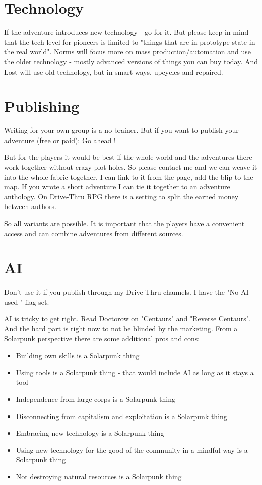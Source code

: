 \section{Technology}

If the adventure introduces new technology - go for it. But please keep in mind that the tech level for pioneers is limited to "things that are in prototype state in the real world". Norms will focus more on mass production/automation and use the older technology - mostly advanced versions of things you can buy today. And Lost will use old technology, but in smart ways, upcycles and repaired.

\section{Publishing}

Writing for your own group is a no brainer. But if you want to publish your adventure (free or paid): Go ahead !

But for the players it would be best if the whole world and the adventures there work together without crazy plot holes. So please contact me and we can weave it into the whole fabric together. I can link to it from the page, add the blip to the map. If you wrote a short adventure I can tie it together to an adventure anthology. On Drive-Thru RPG there is a setting to split the earned money between authors.

So all variants are possible. It is important that the players have a convenient access and can combine adventures from different sources.

\section{AI}

Don't use it if you publish through my Drive-Thru channels. I have the "No AI used " flag set.

AI is tricky to get right. Read Doctorow on "Centaurs" and "Reverse Centaurs". And the hard part is right now to not be blinded by the marketing. From a Solarpunk perspective there are some additional pros and cons:

\begin{itemize}
\item{Building own skills is a Solarpunk thing}
\item{Using tools is a Solarpunk thing - that would include AI as long as it stays a tool}
\item{Independence from large corps is a Solarpunk thing}
\item{Disconnecting from capitalism and exploitation is a Solarpunk thing}
\item{Embracing new technology is a Solarpunk thing}
\item{Using new technology for the good of the community in a mindful way is a Solarpunk thing}
\item{Not destroying natural resources is a Solarpunk thing}
\end{itemize}

